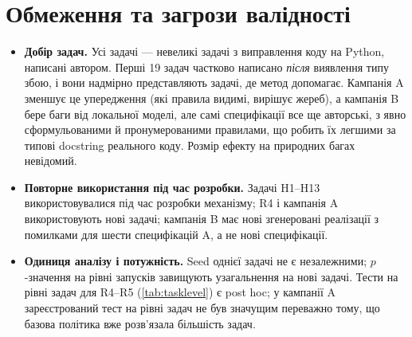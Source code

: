 \documentclass[11pt]{article}
\begin{document}
\section{Обмеження та загрози валідності}\label{sec:limitations}
\begin{itemize}
\item \textbf{Добір задач.} Усі задачі --- невеликі задачі з виправлення коду на Python, написані автором. Перші 19 задач частково написано \emph{після} виявлення типу збою, і вони надмірно представляють задачі, де метод допомагає. Кампанія A зменшує це упередження (які правила видимі, вирішує жереб), а кампанія B бере баги від локальної моделі, але самі специфікації все ще авторські, з явно сформульованими й пронумерованими правилами, що робить їх легшими за типові docstring реального коду. Розмір ефекту на природних багах невідомий.
\item \textbf{Повторне використання під час розробки.} Задачі H1--H13 використовувалися під час розробки механізму; R4 і кампанія A використовують нові задачі; кампанія B має нові згенеровані реалізації з помилками для шести специфікацій A, а не нові специфікації.
\item \textbf{Одиниця аналізу і потужність.} Seed однієї задачі не є незалежними; $p$-значення на рівні запусків завищують узагальнення на нові задачі. Тести на рівні задач для R4--R5 (\cref{tab:tasklevel}) є post hoc; у кампанії A зареєстрований тест на рівні задач не був значущим переважно тому, що базова політика вже розв'язала більшість задач.


\end{itemize}
\end{document}
